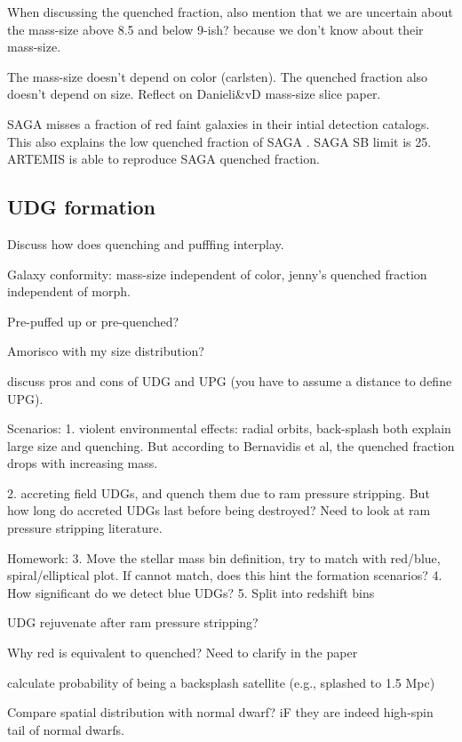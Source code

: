 \documentclass[twocolumn,astrosymb,twocolappendix]{aastex631}
\begin{document}
\begin{CJK*}{UTF8}{gbsn}
When discussing the quenched fraction, also mention that we are uncertain about the mass-size above 8.5 and below 9-ish? because we don't know about their mass-size.

The mass-size doesn't depend on color (carlsten). The quenched fraction also doesn't depend on size. Reflect on Danieli\&vD mass-size slice paper. 

SAGA misses a fraction of red faint galaxies in their intial detection catalogs. This also explains the low quenched fraction of SAGA \citep{CarlstenELVES2022}.
SAGA SB limit is 25. ARTEMIS is able to reproduce SAGA quenched fraction. 







\subsection{UDG formation}
Discuss how does quenching and pufffing interplay.

Galaxy conformity: mass-size independent of color, jenny's quenched fraction independent of morph. 

Pre-puffed up or pre-quenched?

Amorisco with my size distribution?

discuss pros and cons of UDG and UPG (you have to assume a distance to define UPG).

Scenarios:
1. violent environmental effects: radial orbits, back-splash both explain large size and quenching. But according to Bernavidis et al, the quenched fraction drops with increasing mass. 

2. accreting field UDGs, and quench them due to ram pressure stripping. But how long do accreted UDGs last before being destroyed? Need to look at ram pressure stripping literature.

Homework:
3. Move the stellar mass bin definition, try to match with red/blue, spiral/elliptical plot. If cannot match, does this hint the formation scenarios?
4. How significant do we detect blue UDGs? 
5. Split into redshift bins


UDG rejuvenate after ram pressure stripping?

Why red is equivalent to quenched? Need to clarify in the paper

calculate probability of being a backsplash satellite (e.g., splashed to 1.5 Mpc)

Compare spatial distribution with normal dwarf? iF they are indeed high-spin tail of normal dwarfs. 


\end{CJK*}
\end{document}
